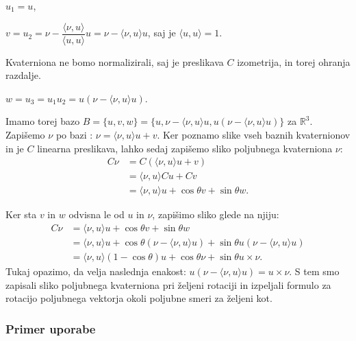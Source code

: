 \documentclass[a4paper,12pt]{article}
\def\R{\mathbb{R}} %
\newcommand{\dotpr}[2]{\langle #1, #2 \rangle}
\begin{document}
\begin{center}
   $u_{1} = u$,

   $v = u_{2} = \nu - \dfrac{\dotpr{\nu}{u}}{\dotpr{u}{u}}u = \nu - \dotpr{\nu}{u}u$, saj je $\dotpr{u}{u} = 1$.
\end{center}
Kvaterniona ne bomo normalizirali, saj je preslikava $C$ izometrija, in torej ohranja razdalje.

\begin{center}
   $w = u_{3} = u_{1} u_{2} = u (\nu - \dotpr{\nu}{u}u)$.
\end{center}
Imamo torej bazo $B = \{u, v, w\} = \{u, \nu - \dotpr{\nu}{u}u, u(\nu - \dotpr{\nu}{u}u)\}$ za $\R^3$.
Zapišemo $\nu$ po bazi : $\nu = \dotpr{\nu}{u}u + v$. Ker poznamo slike vseh baznih kvaternionov in je $C$ linearna preslikava,
lahko sedaj zapišemo sliko poljubnega kvaterniona $\nu$:
\begin{align*}
   C \nu &= C (\dotpr{\nu}{u}u + v)\\
         &= \dotpr{\nu}{u}Cu + Cv\\
         &= \dotpr{\nu}{u}u + \cos\theta v + \sin\theta w.
\end{align*}

\noindent Ker sta $v$ in $w$ odvisna le od $u$ in $\nu$, zapišimo sliko glede na njiju:
\begin{align*}
   C\nu &= \dotpr{\nu}{u}u + \cos\theta v + \sin\theta w\\
        &= \dotpr{\nu}{u}u + \cos\theta (\nu - \dotpr{\nu}{u}u) + \sin\theta u(\nu - \dotpr{\nu}{u}u)\\
        &= \dotpr{\nu}{u}(1 - \cos\theta)u + \cos\theta \nu + \sin\theta u\times\nu.
\end{align*}
Tukaj opazimo, da velja naslednja enakost: $u(\nu - \dotpr{\nu}{u}u) = u\times\nu$. S tem smo zapisali sliko poljubnega kvaterniona pri željeni rotaciji in izpeljali formulo za rotacijo poljubnega vektorja okoli poljubne smeri za željeni kot.
\subsubsection{Primer uporabe}
\end{document}
